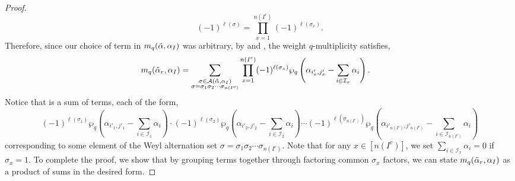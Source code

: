 \documentclass[10pt]{article}
\newcommand{\hr}[0]{\Tilde{\alpha}}
\newcommand{\newmu}[0]{\alpha_I}
\newcommand{\thealtset}[0]{\mathcal{A}(\hr,\newmu)}
\newcommand{\qpartition}[1]{\wp_q\left(#1\right)}
\begin{document}
\begin{proof}
\begin{equation}
        (-1)^{\ell(\sigma)} = \prod_{x=1}^{n(I^c)}(-1)^{\ell(\sigma_x)}.\label{negative one stuff}
    \end{equation}
    Therefore, since our choice of term in $m_q(\hr,\alpha_I)$ was arbitrary, by  and , the weight $q$-multiplicity satisfies,
    \begin{align}
        m_q(\hr_r,\alpha_I) &= \sum_{\substack{\sigma\in\thealtset \\ \sigma=\sigma_1\sigma_2\cdots \sigma_{n(I^c)}}}\prod_{x=1}^{n(I^c)}(-1)^{\ell(\sigma_x)}\qpartition{\alpha_{i'_x,j'_x}-\sum_{i\in\mathcal{I}_x}\alpha_i}.\label{break into product 2}
    \end{align}
    Notice that  is a sum of terms, each of the form,
    \[(-1)^{\ell(\sigma_1)}\qpartition{\alpha_{i'_1,j'_1}-\sum_{i\in\mathcal{I}_1}\alpha_i}\cdot(-1)^{\ell(\sigma_2)}\qpartition{\alpha_{i'_2,j'_2}-\sum_{i\in\mathcal{I}_2}\alpha_i} \cdots (-1)^{\ell(\sigma_{n(I^c)})}\qpartition{\alpha_{i'_{n(I^c)},j'_{n(I^c)}}-\sum_{i\in\mathcal{I}_{n(I^c)}}\alpha_i} \]
    corresponding to some element of the Weyl alternation set $\sigma=\sigma_1\sigma_2\cdots\sigma_{n(I^c)}$. Note that for any $x\in[n(I^c)]$, we set $\sum_{i\in\mathcal{I}_x}\alpha_i=0$ if $\sigma_x=1$. To complete the proof, we show that by grouping terms together through factoring common $\sigma_x$ factors, we can state $m_q(\hr_r,\alpha_I)$ as a product of sums in the desired form. 
    

\end{proof}
\end{document}
